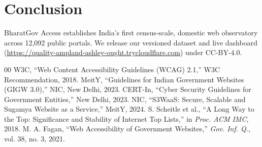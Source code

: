 \documentclass[conference]{IEEEtran}
\begin{document}
\section{Conclusion}
BharatGov Access establishes India's first census-scale, domestic web observatory across 12,092 public portals. We release our versioned dataset and live dashboard (\url{https://quality-ampland-ashley-ought.trycloudflare.com}) under CC-BY-4.0.

\begin{thebibliography}{00}
 W3C, ``Web Content Accessibility Guidelines (WCAG) 2.1,'' W3C Recommendation, 2018.
 MeitY, ``Guidelines for Indian Government Websites (GIGW 3.0),'' NIC, New Delhi, 2023.
 CERT-In, ``Cyber Security Guidelines for Government Entities,'' New Delhi, 2023.
 NIC, ``S3WaaS: Secure, Scalable and Sugamya Website as a Service,'' MeitY, 2024.
 S. Scheitle et al., ``A Long Way to the Top: Significance and Stability of Internet Top Lists,'' in \textit{Proc. ACM IMC}, 2018.
 M. A. Fagan, ``Web Accessibility of Government Websites,'' \textit{Gov. Inf. Q.}, vol. 38, no. 3, 2021.
\end{thebibliography}
\end{document}
